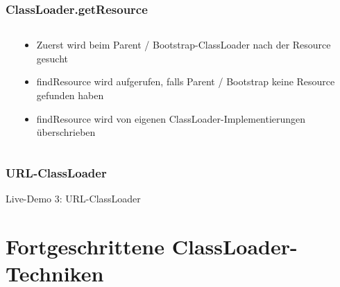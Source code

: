 \documentclass[aspectratio=169]{beamer}
\begin{document}
\begin{frame}[fragile]
	\frametitle{ClassLoader.getResource}
	\begin{columns}[T] 
		\begin{column}{.50\textwidth}
			
	\end{column}
	\hfill
	\begin{column}{.50\textwidth}
			\begin{itemize}
				\item{Zuerst wird beim Parent / Bootstrap-ClassLoader nach der Resource gesucht}
				\item{findResource wird aufgerufen, falls Parent / Bootstrap keine Resource gefunden haben}
				\item{findResource wird von eigenen ClassLoader-Implementierungen überschrieben}
			\end{itemize}
		\end{column}
	\end{columns}
\end{frame}

\begin{frame}
	\frametitle{URL-ClassLoader}
	
\end{frame}

\begin{frame}
	Live-Demo 3: URL-ClassLoader
\end{frame}
 
\section{Fortgeschrittene ClassLoader-Techniken}
\end{document}
